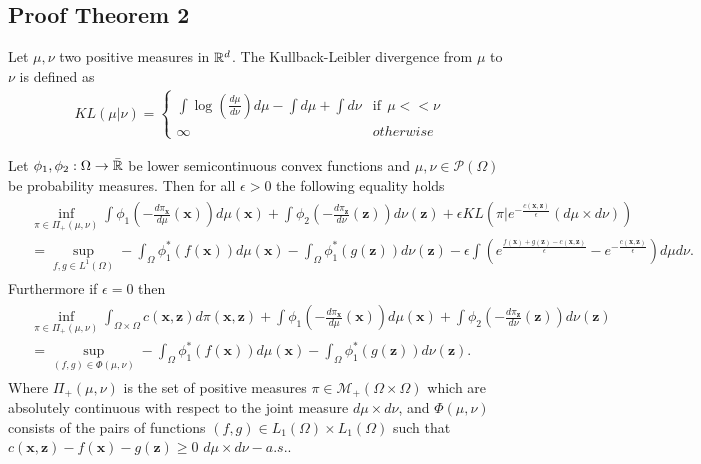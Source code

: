 \subsection{Proof Theorem 2}
\begin{Definition}
Let $\mu, \nu$ two positive measures in $\mathbb{R}^d$. The Kullback-Leibler divergence from $\mu$ to $\nu$ is defined as 
\begin{align}
KL(\mu |\nu )=\begin{cases} 
      \int \log(\frac{d\mu}{d\nu})d\mu-\int d\mu+\int d\nu & \text{if} \ \ \mu  << \nu\\
      \infty & otherwise 
   \end{cases}
\end{align}
\end{Definition}
\begin{Theorem}\label{Theo:generaldual}
Let $\phi_1, \phi_2:\Omega\rightarrow \bar{\mathbb{R}}$ be lower semicontinuous convex functions and $\mu, \nu\in \mathcal{P}(\Omega)$ be probability measures. Then for all $\epsilon>0$ the following equality holds
\begin{align}\label{eq:dual_app}
\begin{split}
	&\inf_{\pi \in\Pi_+(\mu, \nu)} \int{\phi_1(-\frac{d\pi_\textbf{x}}{d\mu}(\textbf{x}))d\mu}(\textbf{x})+\int{\phi_2(-\frac{d\pi_{{\textbf{z}}}}{d\nu}({{\textbf{z}}}))d\nu}({{\textbf{z}}})+\epsilon KL(\pi|e^{-\frac{c(\textbf{x},{{\textbf{z}}})}{\epsilon}}(d\mu\times d\nu))\\&= \sup_{f,g\in L^1(\Omega)}-\int_{\Omega}\phi_1^*(f(\textbf{x}))d\mu(\textbf{x})-\int_{\Omega}\phi_1^*(g({{\textbf{z}}}))d\nu({{\textbf{z}}})-\epsilon \int \left(e^{\frac{f(\textbf{x})+g({{\textbf{z}}})-c(\textbf{x},{{\textbf{z}}})}{\epsilon}}-e^{-\frac{c(\textbf{x},{{\textbf{z}}})}{\epsilon}}\right)d\mu d\nu.
	\end{split}
\end{align}
Furthermore if $\epsilon=0$ then
\begin{align}\label{eq:dual_app_zero}
\begin{split}
	&\inf_{\pi \in\Pi_+(\mu, \nu)}\int_{\Omega\times \Omega}c(\textbf{x},{{\textbf{z}}})d\pi(\textbf{x},{{\textbf{z}}}) + \int{\phi_1(-\frac{d\pi_\textbf{x}}{d\mu}(\textbf{x}))d\mu}(\textbf{x})+\int{\phi_2(-\frac{d\pi_{{\textbf{z}}}}{d\nu}({{\textbf{z}}}))d\nu}({{\textbf{z}}})\\&= \sup_{(f,g)\in \Phi(\mu, \nu)}-\int_{\Omega}\phi_1^*(f(\textbf{x}))d\mu(\textbf{x})-\int_{\Omega}\phi_1^*(g({{\textbf{z}}}))d\nu({{\textbf{z}}}).
	\end{split}
\end{align}
Where $\Pi_+(\mu, \nu)$ is the set of positive measures $\pi\in \mathcal{M}_+(\Omega\times \Omega)$ which are absolutely continuous  with respect to the joint measure $d\mu\times d\nu$, and $\Phi(\mu, \nu)$ consists of the pairs of functions $(f,g)\in L_1(\Omega)\times L_1(\Omega)$ such that $c(\textbf{x},{{\textbf{z}}})-f(\textbf{x})-g({{\textbf{z}}}) \geq 0$ $ d\mu\times d\nu -a.s.$.
\end{Theorem}

